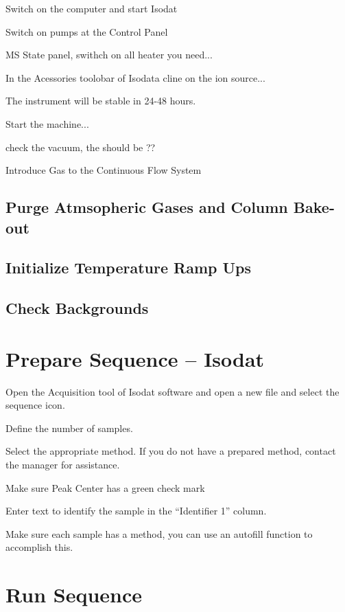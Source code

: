 \documentclass[12pt]{../SOP4_alpha}\usepackage[]{graphicx}\usepackage[]{color}
\begin{document}
\NP Switch on the computer and start Isodat

\NP Switch on pumps at the Control Panel

\NP MS State panel, swithch on all heater you need...

\NP In the Acessories toolobar of Isodata cline on the ion source...

\NP The instrument will be stable in 24-48 hours.

\NP Start the machine...

\NP check the vacuum, the should be ??

\NP Introduce Gas to the Continuous Flow System

\subsection{Purge Atmsopheric Gases and Column Bake-out}



\subsection{Initialize Temperature Ramp Ups}


\subsection{Check Backgrounds}



\section{Prepare Sequence -- Isodat}

\NP Open the Acquisition tool of Isodat software and open a new file and select the sequence icon. 

\NP Define the number of samples. 

\NP Select the appropriate method. If you do not have a prepared method, contact the manager for assistance. 

\NP Make sure Peak Center has a green check mark

\NP Enter text to identify the sample in the ``Identifier 1'' column.

\NP Make sure each sample has a method, you can use an autofill function to accomplish this.

\section{Run Sequence}
\end{document}
